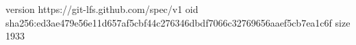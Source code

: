 version https://git-lfs.github.com/spec/v1
oid sha256:ed3ae479e56e11d657af5cbf44c276346dbdf7066c32769656aaef5cb7ea1c6f
size 1933
